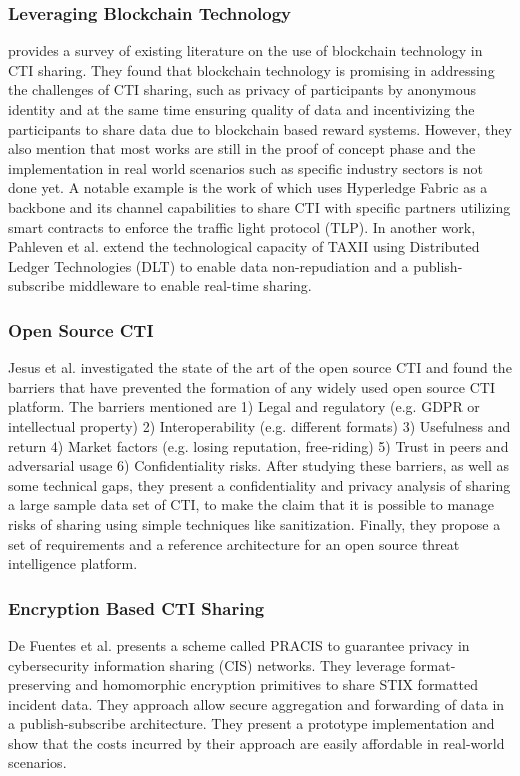 \subsubsection{Leveraging Blockchain Technology}
\cite{el-kosairy_survey_2023} provides a survey of existing literature on the use of blockchain technology in CTI sharing. They found that blockchain technology is promising in addressing the challenges of CTI sharing, such as privacy of participants by anonymous identity and at the same time ensuring quality of data and incentivizing the participants to share data due to blockchain based reward systems. However, they also mention that most works are still in the proof of concept phase and the implementation in real world scenarios such as specific industry sectors is not done yet. A notable example is the work of \cite{homan_new_2019} which uses Hyperledge Fabric as a backbone and its channel capabilities to share CTI with specific partners utilizing smart contracts to enforce the traffic light protocol (TLP). In another work, Pahleven et al. \cite{pahlevan_secure_2021} extend the technological capacity of TAXII using Distributed Ledger Technologies (DLT) to enable data non-repudiation and a publish-subscribe middleware to enable real-time sharing.
\subsubsection{Open Source CTI} Jesus et al. \cite{jesus_sharing_2023} investigated the state of the art of the open source CTI and found the barriers that have prevented the formation of any widely used open source CTI platform. 
The barriers mentioned are 1) Legal and regulatory (e.g. GDPR or intellectual property) 2) Interoperability (e.g. different formats) 3) Usefulness and return 4) Market factors (e.g. losing reputation, free-riding) 5) Trust in peers and adversarial usage 6) Confidentiality risks. After studying these barriers, as well as some technical gaps, they present a confidentiality and privacy analysis of sharing a large sample data set of CTI, to make the claim that it is possible to manage risks of sharing using simple techniques like sanitization. Finally, they propose a set of requirements and a reference architecture for an open source threat intelligence platform. 
\subsubsection{Encryption Based CTI Sharing} De Fuentes et al. \cite{de_fuentes_pracis_2017} presents a scheme called PRACIS to guarantee privacy in cybersecurity information sharing (CIS) networks. They leverage format-preserving and homomorphic encryption primitives to share STIX formatted incident data. They approach allow secure aggregation and forwarding of data in a publish-subscribe architecture. They present a prototype implementation and show that the costs incurred by their approach are easily affordable in real-world scenarios.
